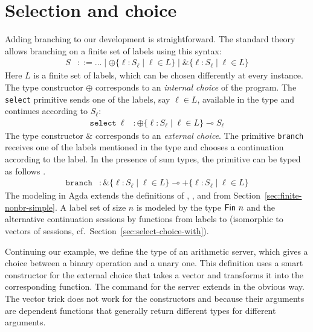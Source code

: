 \documentclass[acmsmall,screen,anonymous,review]{acmart}
\begin{document}
\section{Selection and choice}
\label{sec:select-choice}

Adding branching to our development is straightforward. The standard
theory allows branching on a finite set of labels using this syntax:
\begin{align*}
  S & ::= \dots \mid \oplus\{ \ell : S_\ell \mid \ell \in L \} \mid
      \&\{\ell: S_\ell \mid \ell \in L\}
\end{align*}
Here $L$ is a finite set of labels, which can be chosen differently at
every instance. 
The type constructor $\oplus$ corresponds to an \emph{internal choice} of the
program.  The \texttt{select} primitive sends one of the labels, say $\ell \in L$, available in the
type and continues according to $S_\ell$:
\begin{align*}
  \mathtt{select}\ \ell &: \oplus\{ \ell : S_\ell \mid \ell \in L \}
                          \multimap S_\ell
\end{align*}
The type constructor $\&$ corresponds to an \emph{external choice}. The
primitive \texttt{branch} receives one of the labels 
mentioned in the type and chooses a continuation according to the
label. In the presence of sum types, the primitive can be typed as
follows \cite{DBLP:journals/toplas/Padovani19}.
\begin{align*}
  \mathtt{branch} &: \&\{\ell: S_\ell \mid \ell \in L\} \multimap +\{\ell: S_\ell \mid \ell \in L\}
\end{align*}
The modeling in Agda extends the definitions of
{\ASession}, {\ACommand}, and {\Aexecutor} from
Section~\ref{sec:finite-nonbr-simple}. A label set of size $n$ is
modeled by the type $\AFin~n$ and the alternative continuation sessions by
functions from labels to {\ASession} (isomorphic to vectors of sessions, cf.\  Section~\ref{sec:select-choice-with}).
\stBranchingType
\stBranchingCommand
\stExecutorSignature\vspace{-1.5\baselineskip}
\stBranchingExecutor

Continuing our example, we define the type of an arithmetic server,
which gives a choice between a binary operation and a unary one. 
This definition uses a smart constructor for the external choice that
takes a vector and transforms it into the corresponding function.
\stExampleArithP
The command for the server extends in the obvious way. The vector
trick does not work for the {\ACommand} constructors {\ACSELECT} and
{\ACCHOICE} because their arguments are dependent functions that
generally return different types for different arguments.
\stArithpCommand
\end{document}
